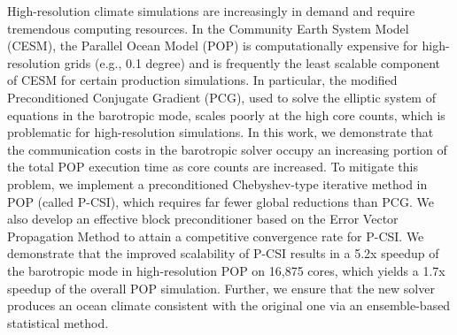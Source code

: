 \begin{eabstract}
  High-resolution climate simulations are increasingly in demand and
  require tremendous computing resources. In the Community
  Earth System Model (CESM), the Parallel Ocean Model (POP) is
  computationally expensive for high-resolution grids (e.g.,
  0.1 degree) and is frequently the least scalable component of CESM for certain
  production simulations. In particular, the modified Preconditioned
  Conjugate Gradient (PCG), used to solve the elliptic system of
  equations in the barotropic mode, scales poorly at the high core
  counts, which is problematic for high-resolution simulations. In
  this work, we demonstrate that the communication costs in the
  barotropic solver occupy an increasing portion of the total POP
  execution time as core counts are increased. To mitigate this
  problem, we implement a preconditioned Chebyshev-type iterative
  method in POP (called P-CSI), which requires far fewer global
  reductions than PCG.  We also develop an effective block
  preconditioner based on the Error Vector Propagation Method to
  attain a competitive convergence rate for P-CSI.  We demonstrate
  that the improved scalability of P-CSI results in a 5.2x speedup of
  the barotropic mode in high-resolution POP on 16,875 cores, which
  yields a 1.7x speedup of the overall POP simulation.  Further,
  we ensure that the new solver produces an ocean climate consistent with the original
  one via an ensemble-based statistical method.
\end{eabstract}

